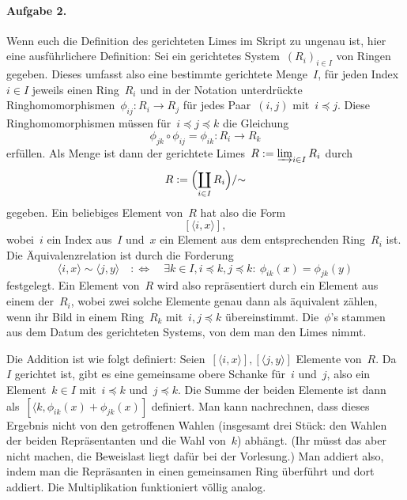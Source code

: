 \documentclass{algblatt}
\newcommand{\hint}[1]{\rotatebox{180}{\vbox{\textcolor{grey}{#1}}}}
\begin{document}
\hint{%
Teilaufgabe~b) kann man so anpacken, indem man erstmal ausschreibt, was die
Voraussetzungen sind: Lokal sind Inverse geben, die haben eine bestimmte Form.
Die Inversen sind wirklich Inverse (erfüllen also eine entsprechende Gleichung
die auf~"`$=1$"' endet), das nach kann man Definition in einer Gleichung
über~$R$ umwandeln. Dann mit~"`o.\,B.\,d.\,A."''s etwas Ordnung in den
Index-Dschungel bringen und den~"`$1^N$"'-Trick der Vorlesung verwenden.
Alternativ kann man auch ein bestimmtes Lemma der Vorlesung zu Hilfe nehmen,
dann tauscht man ein paar Rechnungen gegen ein paar allgemeine Überlegungen
ein.
}

\paragraph{Aufgabe 2.} Wenn euch die Definition des gerichteten Limes
im Skript zu ungenau ist, hier eine ausführlichere Definition: Sei ein
gerichtetes System~$(R_i)_{i \in I}$ von Ringen gegeben. Dieses umfasst also
eine bestimmte gerichtete Menge~$I$, für jeden Index~$i \in I$ jeweils einen
Ring~$R_i$ und in der Notation unterdrückte Ringhomomorphismen~$\phi_{ij} : R_i
\to R_j$ für jedes Paar~$(i,j)$ mit~$i \preceq j$. Diese Ringhomomorphismen
müssen für~$i \preceq j \preceq k$ die Gleichung
\[ \phi_{jk} \circ \phi_{ij} = \phi_{ik} : R_i \to R_k \]
erfüllen. Als Menge ist dann der gerichtete Limes~$R :=
\varinjlim_{i \in I} R_i$ durch
\[ R := \Bigl(\coprod_{i \in I} R_i\Bigr)/{\sim} \]
gegeben. Ein beliebiges Element von~$R$ hat also die Form
\[ [\langle i, x\rangle], \]
wobei~$i$ ein Index aus~$I$ und~$x$ ein Element aus dem entsprechenden
Ring~$R_i$ ist. Die Äquivalenzrelation ist durch die Forderung
\[ \langle i, x \rangle \sim \langle j, y \rangle
  \quad:\Longleftrightarrow\quad
  \exists k \in I, i \preceq k, j \preceq k{:}\ \phi_{ik}(x) = \phi_{jk}(y) \]
festgelegt. Ein Element von~$R$ wird also repräsentiert durch ein Element
aus einem der~$R_i$, wobei zwei solche Elemente genau dann als äquivalent
zählen, wenn ihr Bild in einem Ring~$R_k$ mit~$i,j \preceq k$ übereinstimmt.
Die~$\phi$'s stammen aus dem Datum des gerichteten Systems, von dem man den
Limes nimmt.

Die Addition ist wie folgt definiert: Seien~$[\langle i, x \rangle], [\langle
j, y\rangle]$ Elemente von~$R$. Da~$I$ gerichtet ist, gibt es eine gemeinsame
obere Schanke für~$i$ und~$j$, also ein Element~$k \in I$ mit~$i \preceq k$
und~$j \preceq k$. Die Summe der beiden Elemente ist dann als~$[\langle k,
\phi_{ik}(x) + \phi_{jk}(x)]$ definiert. Man kann nachrechnen, dass dieses
Ergebnis nicht von den getroffenen Wahlen (insgesamt drei Stück: den Wahlen der
beiden Repräsentanten und die Wahl von~$k$) abhängt. (Ihr müsst das aber nicht
machen, die Beweislast liegt dafür bei der Vorlesung.) Man addiert also, indem
man die Repräsanten in einen gemeinsamen Ring überführt und dort addiert. Die
Multiplikation funktioniert völlig analog.
\end{document}
